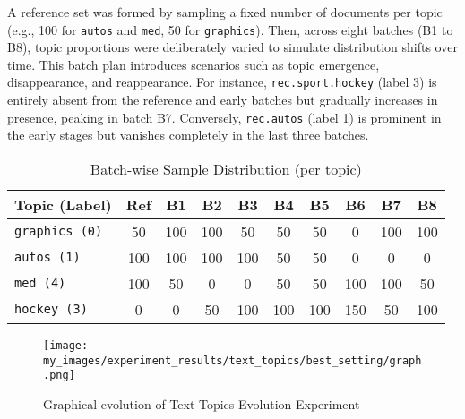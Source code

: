 A reference set was formed by sampling a fixed number of documents per topic
(e.g., 100 for \texttt{autos} and \texttt{med}, 50 for \texttt{graphics}).
Then, across eight batches (B1 to B8), topic proportions were deliberately
varied to simulate distribution shifts over time. This batch plan introduces
scenarios such as topic emergence, disappearance, and reappearance. For
instance, \texttt{rec.sport.hockey} (label 3) is entirely absent from the
reference and early batches but gradually increases in presence, peaking in
batch B7. Conversely, \texttt{rec.autos} (label 1) is prominent in the early
stages but vanishes completely in the last three batches.

\begin{table}[H]
      \centering
      \begin{tabular}{lccccccccc}
            \hline
            \textbf{Topic (Label)} & Ref & B1  & B2  & B3  & B4  & B5  & B6  & B7  & B8  \\
            \hline
            \texttt{graphics (0)}  & 50  & 100 & 100 & 50  & 50  & 50  & 0   & 100 & 100 \\
            \texttt{autos (1)}     & 100 & 100 & 100 & 100 & 50  & 50  & 0   & 0   & 0   \\
            \texttt{med (4)}       & 100 & 50  & 0   & 0   & 50  & 50  & 100 & 100 & 50  \\
            \texttt{hockey (3)}    & 0   & 0   & 50  & 100 & 100 & 100 & 150 & 50  & 100 \\
            \hline
      \end{tabular}
      \caption{Batch-wise Sample Distribution (per topic)}
\end{table}

\begin{figure}[h]
      \centering
      \texttt{[image: my\_images/experiment\_results/text\_topics/best\_setting/graph.png]}
      \caption{Graphical evolution of Text Topics Evolution Experiment}
\end{figure}